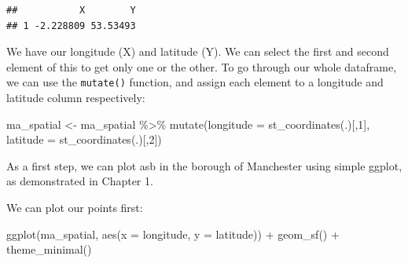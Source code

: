 \documentclass[
]{book}
\newenvironment{Shaded}{\begin{snugshade}}{\end{snugshade}}
\newcommand{\AttributeTok}[1]{\textcolor[rgb]{0.77,0.63,0.00}{#1}}
\newcommand{\DecValTok}[1]{\textcolor[rgb]{0.00,0.00,0.81}{#1}}
\newcommand{\FunctionTok}[1]{\textcolor[rgb]{0.00,0.00,0.00}{#1}}
\newcommand{\NormalTok}[1]{#1}
\newcommand{\OtherTok}[1]{\textcolor[rgb]{0.56,0.35,0.01}{#1}}
\newcommand{\SpecialCharTok}[1]{\textcolor[rgb]{0.00,0.00,0.00}{#1}}
\begin{document}
\begin{verbatim}
##           X        Y
## 1 -2.228809 53.53493
\end{verbatim}

We have our longitude (X) and latitude (Y). We can select the first and second element of this to get only one or the other. To go through our whole dataframe, we can use the \texttt{mutate()} function, and assign each element to a longitude and latitude column respectively:

\begin{Shaded}
\begin{Highlighting}[]
\NormalTok{ma\_spatial }\OtherTok{\textless{}{-}}\NormalTok{ ma\_spatial }\SpecialCharTok{\%\textgreater{}\%} 
  \FunctionTok{mutate}\NormalTok{(}\AttributeTok{longitude =} \FunctionTok{st\_coordinates}\NormalTok{(.)[,}\DecValTok{1}\NormalTok{],}
         \AttributeTok{latitude =} \FunctionTok{st\_coordinates}\NormalTok{(.)[,}\DecValTok{2}\NormalTok{])}
\end{Highlighting}
\end{Shaded}

As a first step, we can plot asb in the borough of Manchester using simple ggplot, as demonstrated in Chapter 1.

We can plot our points first:

\begin{Shaded}
\begin{Highlighting}[]
\FunctionTok{ggplot}\NormalTok{(ma\_spatial, }\FunctionTok{aes}\NormalTok{(}\AttributeTok{x =}\NormalTok{ longitude, }\AttributeTok{y =}\NormalTok{ latitude)) }\SpecialCharTok{+}
  \FunctionTok{geom\_sf}\NormalTok{() }\SpecialCharTok{+} 
  \FunctionTok{theme\_minimal}\NormalTok{()}
\end{Highlighting}
\end{Shaded}
\end{document}
